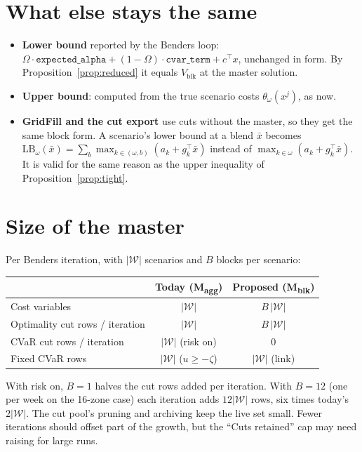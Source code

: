 \documentclass[11pt]{article}
\theoremstyle{remark}
\newcommand{\W}{\mathcal{W}}
\begin{document}
\section{What else stays the same}

\begin{itemize}[leftmargin=*]
  \item \textbf{Lower bound} reported by the Benders loop:
        $\Omega\cdot\texttt{expected\_alpha} + (1-\Omega)\cdot\texttt{cvar\_term} + c^\top x$,
        unchanged in form. By Proposition~\ref{prop:reduced} it equals $V_{\text{blk}}$ at the
        master solution.
  \item \textbf{Upper bound}: computed from the true scenario costs $\theta_\omega(x^j)$, as now.
  \item \textbf{GridFill and the cut export} use cuts without the master, so they get the same
        block form. A scenario's lower bound at a blend $\bar x$ becomes
        $\mathrm{LB}_\omega(\bar x) = \sum_b \max_{k \in (\omega, b)} (a_k + g_k^\top \bar x)$
        instead of $\max_{k \in \omega}(a_k + g_k^\top \bar x)$. It is valid for the same reason as
        the upper inequality of Proposition~\ref{prop:tight}.
\end{itemize}

\section{Size of the master}

Per Benders iteration, with $|\W|$ scenarios and $B$ blocks per scenario:

\begin{center}
\begin{tabular}{@{}lcc@{}}
  \toprule
                                   & Today (M\textsubscript{agg}) & Proposed (M\textsubscript{blk}) \\
  \midrule
  Cost variables                   & $|\W|$                      & $B\,|\W|$ \\
  Optimality cut rows / iteration  & $|\W|$                      & $B\,|\W|$ \\
  CVaR cut rows / iteration        & $|\W|$ (risk on)            & $0$ \\
  Fixed CVaR rows                  & $|\W|$ ($u \ge -\zeta$)     & $|\W|$ (link) \\
  \bottomrule
\end{tabular}
\end{center}

\noindent With risk on, $B = 1$ halves the cut rows added per iteration. With $B = 12$ (one per week
on the 16-zone case) each iteration adds $12|\W|$ rows, six times today's $2|\W|$. The cut pool's
pruning and archiving keep the live set small. Fewer iterations should offset part of the growth,
but the ``Cuts retained'' cap may need raising for large runs.
\end{document}
